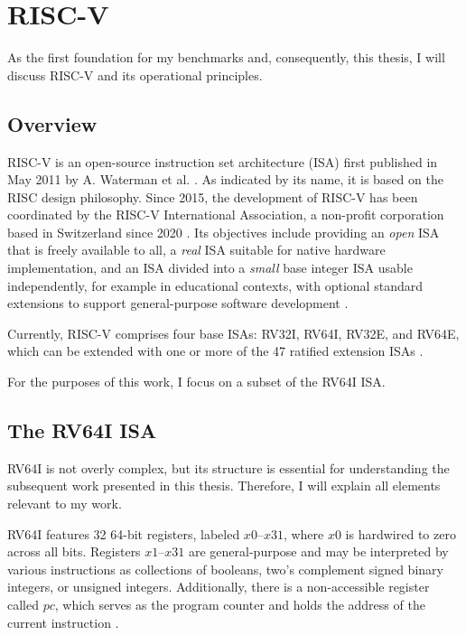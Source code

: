 \chapter{RISC-V}\label{chap:riscv}

As the first foundation for my benchmarks and, consequently, this
thesis, I will discuss RISC-V and its operational principles.

\section{Overview}

RISC-V is an open-source instruction set architecture (ISA) first
published in May 2011 by A. Waterman et al. \cite{first_riscv}. As
indicated by its name, it is based on the RISC design philosophy.
 Since 2015, the development of
RISC-V has been coordinated by the RISC-V International Association,
a non-profit corporation based in Switzerland since 2020
\cite{riscvorg}. Its objectives include providing an \emph{open} ISA
that is freely available to all, a \emph{real} ISA suitable for
native hardware implementation, and an ISA divided into a
\emph{small} base integer ISA usable independently, for example in
educational contexts, with optional standard extensions to support
general-purpose software development \cite[Chapter 1]{riscv-isa}.

Currently, RISC-V comprises four base ISAs: RV32I, RV64I, RV32E, and
RV64E, which can be extended with one or more of the 47 ratified
extension ISAs \cite[Preface]{riscv-isa}.


For the purposes of this work, I focus on a subset of the RV64I ISA.

\section{The RV64I ISA} \label{sec:riscvIsa}
RV64I is not overly complex, but its structure is essential for
understanding the subsequent work presented in this thesis.
Therefore, I will explain all elements relevant to my work.

RV64I features 32 64-bit registers, labeled $x0$–$x31$, where $x0$ is
hardwired to zero across all bits. Registers $x1$–$x31$ are
general-purpose and may be interpreted by various instructions as
collections of booleans, two's complement signed binary integers, or
unsigned integers. Additionally, there is a non-accessible register
called $pc$, which serves as the program counter and holds the
address of the current instruction \cite[Chapters 4.1,
      2.1]{riscv-isa}.

